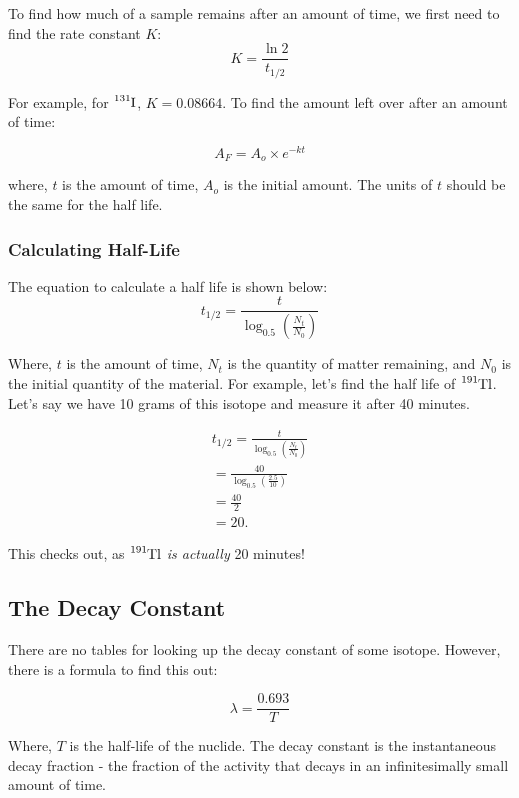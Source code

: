 \documentclass{article}
\begin{document}
\begin{multicols*}{2}
    To find how much of a sample remains after an amount of time, we first
    need to find the rate constant $K$:
    \[
      K = \frac{\ln 2}{t_{1/2}}
    \]

    For example, for $\ce{^{131}I}$, $K=0.08664$. To find the amount left
    over after an amount of time:

    \[
      A_F = A_o \times e^{-kt}
    \]

    where, $t$ is the amount of time, $A_o$ is the initial amount. The units
    of $t$ should be the same for the half life.

    \subsubsection{Calculating Half-Life}
    The equation to calculate a half life is shown below:
    \[
      t_{1/2} = \frac{t}{ \log_{0.5}\left( \frac{N_t}{N_0} \right) }
    \]

    Where, $t$ is the amount of time, $N_t$ is the quantity of matter remaining,
    and $N_0$ is the initial quantity of the material. For example, let's find
    the half life of $\ce{^{191}Tl}$. Let's say we have 10 grams of this isotope
    and measure it after 40 minutes.

    \begin{equation*}
      \begin{split}
        t_{1/2} = \frac{t}{ \log_{0.5}\left( \frac{N_t}{N_0} \right) } \\
        = \frac{40}{ \log_{0.5}\left( \frac{2.5}{10} \right) } \\
        = \frac{40}{2} \\
        = 20.
      \end{split}
    \end{equation*}
    
    This checks out, as $\ce{^{191}Tl}$ \textit{is actually} 20 minutes!
    \subsection{The Decay Constant}
    There are no tables for looking up the decay constant of some isotope.
    However, there is a formula to find this out:

    \[
      \lambda = \frac{0.693}{T}
    \]

    Where, $T$ is the half-life of the nuclide. The decay constant is the
    instantaneous decay fraction - the fraction of the activity that decays
    in an infinitesimally small amount of time.\\


\end{multicols*}
\end{document}
